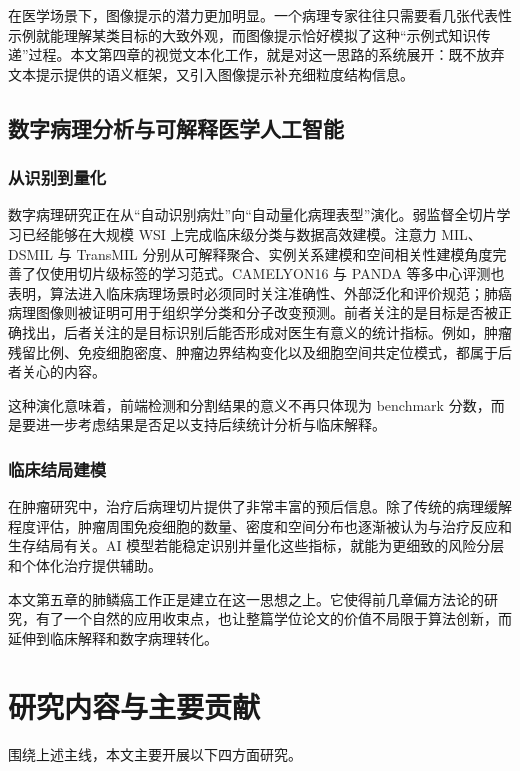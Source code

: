 在医学场景下，图像提示的潜力更加明显。一个病理专家往往只需要看几张代表性示例就能理解某类目标的大致外观，而图像提示恰好模拟了这种“示例式知识传递”过程。本文第四章的视觉文本化工作，就是对这一思路的系统展开：既不放弃文本提示提供的语义框架，又引入图像提示补充细粒度结构信息。

\subsection{数字病理分析与可解释医学人工智能}
\subsubsection{从识别到量化}
数字病理研究正在从“自动识别病灶”向“自动量化病理表型”演化。弱监督全切片学习已经能够在大规模 WSI 上完成临床级分类与数据高效建模\cite{campanella2019clinical,lu2021clam}。注意力 MIL、DSMIL 与 TransMIL 分别从可解释聚合、实例关系建模和空间相关性建模角度完善了仅使用切片级标签的学习范式\cite{ilse2018attentionmil,li2021dsmil,shao2021transmil}。CAMELYON16 与 PANDA 等多中心评测也表明，算法进入临床病理场景时必须同时关注准确性、外部泛化和评价规范\cite{bejnordi2017camelyon,bulten2022panda}；肺癌病理图像则被证明可用于组织学分类和分子改变预测\cite{coudray2018lung}。前者关注的是目标是否被正确找出，后者关注的是目标识别后能否形成对医生有意义的统计指标。例如，肿瘤残留比例、免疫细胞密度、肿瘤边界结构变化以及细胞空间共定位模式，都属于后者关心的内容。

这种演化意味着，前端检测和分割结果的意义不再只体现为 benchmark 分数，而是要进一步考虑结果是否足以支持后续统计分析与临床解释。

\subsubsection{临床结局建模}
在肿瘤研究中，治疗后病理切片提供了非常丰富的预后信息。除了传统的病理缓解程度评估，肿瘤周围免疫细胞的数量、密度和空间分布也逐渐被认为与治疗反应和生存结局有关。AI 模型若能稳定识别并量化这些指标，就能为更细致的风险分层和个体化治疗提供辅助。

本文第五章的肺鳞癌工作正是建立在这一思想之上。它使得前几章偏方法论的研究，有了一个自然的应用收束点，也让整篇学位论文的价值不局限于算法创新，而延伸到临床解释和数字病理转化。

\section{研究内容与主要贡献}
围绕上述主线，本文主要开展以下四方面研究。

